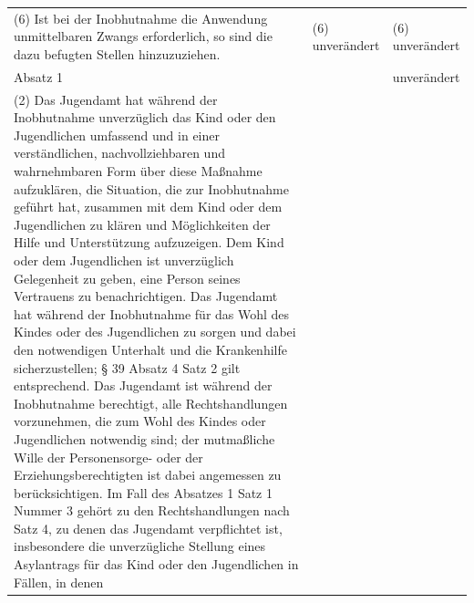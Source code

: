 \documentclass[10pt,a4paper,landscape]{article}
\begin{document}
\begin{longtable}{|L{8.2cm}|L{8.2cm}|L{8.2cm}|}
\hhline{|---|}
(6) Ist bei der Inobhutnahme die  \newline Anwendung unmittelbaren Zwangs  \newline erforderlich, so sind die dazu befugten  \newline Stellen hinzuzuziehen. & (6) unverändert & (6) unverändert \\
\hhline{|---|}
Absatz 1 &  & unverändert \\
\hhline{|---|}
(2) Das Jugendamt hat während der  \newline Inobhutnahme unverzüglich das Kind oder  \newline den Jugendlichen umfassend und in einer  \newline verständlichen, nachvollziehbaren und  \newline wahrnehmbaren Form über diese  \newline Maßnahme aufzuklären, die Situation, die  \newline zur Inobhutnahme geführt hat, zusammen  \newline mit dem Kind oder dem Jugendlichen zu  \newline klären und Möglichkeiten der Hilfe und  \newline Unterstützung aufzuzeigen. Dem Kind oder  \newline dem Jugendlichen ist unverzüglich  \newline Gelegenheit zu geben, eine Person seines  \newline Vertrauens zu benachrichtigen. Das  \newline Jugendamt hat während der Inobhutnahme  für das Wohl des Kindes oder des  \newline Jugendlichen zu sorgen und dabei den  \newline notwendigen Unterhalt und die  \newline Krankenhilfe sicherzustellen; \S{} \textcolor{diffred}{39} Absatz 4  \newline Satz 2 gilt entsprechend. Das Jugendamt  \newline ist während der Inobhutnahme berechtigt,  \newline alle Rechtshandlungen vorzunehmen, die  \newline zum Wohl des Kindes oder Jugendlichen  \newline notwendig sind; der mutmaßliche Wille der  \newline Personensorge- oder der  \newline Erziehungsberechtigten ist dabei  \newline angemessen zu berücksichtigen. Im Fall  \newline des Absatzes 1 Satz 1 Nummer 3 gehört  \newline zu den Rechtshandlungen nach Satz 4, zu  \newline denen das Jugendamt verpflichtet ist,  \newline insbesondere die unverzügliche Stellung  \newline eines Asylantrags für das Kind oder den  \newline Jugendlichen in Fällen, in denen 
\end{longtable}
\end{document}
